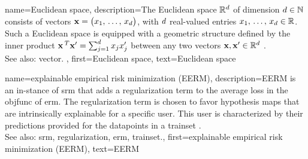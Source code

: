 {name={Euclidean space}, 
	description={The 
		Euclidean space $\mathbb{R}^{d}$ of dimension $d \in \mathbb{N}$ consists 
		of \glspl{vector} ${\bf x}= \big(x_{1}, \,\ldots, \,x_{d}\big)$, with $d$ 
		real-valued entries $x_{1}, \,\ldots, \,x_{d} \in \mathbb{R}$. Such a Euclidean 
		space is equipped with a geometric structure defined by the inner product 
		${\bf x}\,^{T} {\bf x}' = \sum_{j=1}^{d} x_{j} x'_{j}$ 
		between any two \glspl{vector} ${\bf x},{\bf x}' \in \mathbb{R}^{d}$ \cite{RudinBookPrinciplesMatheAnalysis}.
		\\
		See also: \gls{vector}. },
	first={Euclidean space},
	text={Euclidean space} 
}

{name={explainable empirical risk minimization (EERM)}, 
	description={EERM is an 
		in-\linebreak stance of \gls{srm} that adds a \gls{regularization} term to the 
		average \gls{loss} in the \gls{objfunc} of \gls{erm}. 
		The \gls{regularization} term is chosen to favor \gls{hypothesis} \glspl{map} that are intrinsically 
		explainable for a specific user. This user is characterized by their \glspl{prediction} provided 
		for the \glspl{datapoint} in a \gls{trainset} \cite{Zhang:2024aa}.
				\\
		See also: \gls{srm}, \gls{regularization}, \gls{erm}, \gls{trainset}.},
	first={explainable empirical risk minimization (EERM)},
	text={EERM} 
}
	
